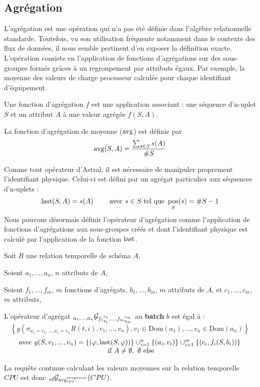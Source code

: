\subsection{Agrégation}
L'agrégation est une opération qui n'a pas été définie dans l'algèbre relationnelle standarde. Toutefois, vu son utilisation fréquente notamment dans le contexte des flux de données, il nous semble pertinent d'en exposer la définition exacte. L'opération consiste en l'application de fonctions d'agrégations sur des sous-groupes formés grâces à un regroupement par attributs égaux. Par exemple, la moyenne des valeurs de charge processeur calculée pour chaque identifiant d'équipement. 
\begin{defi}
    Une fonction d'agrégation $f$ est une application associant : une séquence d'n-uplet $S$ et un attribut $A$ à une valeur agrégée $f(S,A)$.
\end{defi}
\begin{example}
    La fonction d'agrégation de moyenne ($\mathrm{avg}$) est définie par $$\mathrm{avg}(S,A) = \frac{\sum_{s\in S} s(A)}{\# S}$$
\end{example}

Comme tout opérateur d'Astral, il est nécessaire de manipuler proprement l'identifiant physique. Celui-ci est défini par un agrégat particulier aux séquences d'n-uplets : 
$$\mathrm{last}(S,A) = s(A) \qquad \textrm{ avec } s\in S \textrm{ tel que }\mathop{\mathrm{pos}}_{S}(s) = \#S-1$$
Nous pouvons désormais définir l'opérateur d'agrégation comme l'application de fonctions d'agrégations aux sous-groupes créés et dont l'identifiant physique est calculé par l'application de la fonction $\mathrm{last}$.
\begin{defi}
    Soit $R$ une relation temporelle de schéma $A$,

    Soient $a_1,...,a_n$, $n$ attributs de $A$,

    Soient $f_1,...,f_m$, $m$ fonctions d'agrégats, $b_1,...,b_m$, $m$ attributs de $A$, et $c_1,...,c_m$, $m$ attributs,

    L'opérateur d'agrégat $_{a_1,...,a_n}\mathcal{G}_{{f_1}_{b_1}^{c_1},...,{f_m}_{b_m}^{c_m}}$ au \textbf{batch} $b$ est égal à :
$$\left\{g(\sigma_{a_1=v_1,...,a_1=v_n} R(t,i),v_1,...,v_n), v_1 \in \mathrm{Dom}(a_1), ..., v_n \in \mathrm{Dom}(a_n)\right\} $$
$$\begin{array}{c}\textrm{avec } g(S,v_1,...,v_n) = \{(\varphi,\mathrm{last}(S,\varphi))\}\cup_{i=1}^n \{(a_i, v_i)\} \cup_{i=1}^m \{(c_i,f_i(S,b_i))\}\\ \textrm{ if } A \neq \emptyset,\ \emptyset\textrm{ else}\end{array}$$
\end{defi}

\begin{example}
    La requête continue calculant les valeurs moyennes sur la relation temporelle $CPU$ est donc $_{id}\mathcal{G}_{\mathrm{avg}_{cpu}^{moyenne}}(CPU)$.
\end{example}

